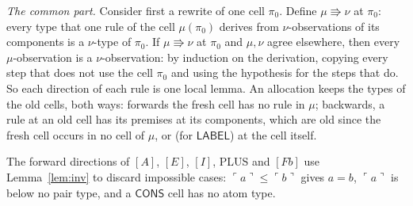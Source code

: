 \documentclass[11pt]{amsart}
\theoremstyle{definition}
\theoremstyle{remark}
\newcommand{\kw}[1]{\mathsf{#1}}
\newcommand{\at}[1]{\ulcorner #1\urcorner}
\begin{document}
\noindent\emph{The common part.} Consider first a rewrite of one cell
$\pi_0$. Define $\mu\Rrightarrow\nu$
at $\pi_0$: every type that one rule of the cell $\mu(\pi_0)$ derives from
$\nu$-observations of its components is a $\nu$-type of $\pi_0$. If
$\mu\Rrightarrow\nu$ at $\pi_0$ and $\mu,\nu$ agree elsewhere, then every
$\mu$-observation is a $\nu$-observation: by induction on the derivation,
copying every step that does not use the cell $\pi_0$ and using the hypothesis
for the steps that do. So each direction of each rule is one local lemma.
An allocation keeps the types of the old cells, both ways: forwards the
fresh cell has no rule in $\mu$; backwards, a rule at an old cell has its
premises at its components, which are old since the fresh cell occurs in
no cell of $\mu$, or (for $\kw{LABEL}$) at the cell itself.

The forward directions of $[A]$, $[E]$, $[I]$, PLUS and $[Fb]$ use
Lemma~\ref{lem:inv} to discard impossible cases: $\at a\le\at b$ gives $a=b$,
$\at a$ is below no pair type, and a $\kw{CONS}$ cell has no atom type.
\end{document}
